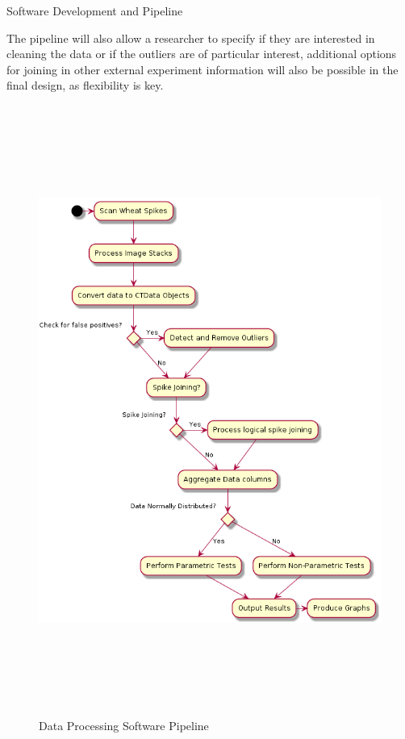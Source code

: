 \documentclass[final]{beamer}
\begin{document}
\begin{frame}{}
\begin{textblock}{28}
\begin{block}{Software Development and Pipeline}
\begin{multicols}{2}
      \vspace{0.5cm}

      The pipeline will also allow a researcher to specify if they are interested in cleaning the data
      or if the outliers are of particular interest, additional options for joining in other external
      experiment information will also be possible in the final design, as flexibility is key.

        \columnbreak

        \begin{figure}[htb]
          \centering
          \includegraphics[width=13.5cm, height=20cm]{flow.png}
          \caption{\label{fig:flow} Data Processing Software Pipeline }
        \end{figure}


\end{multicols}
\end{block}
\end{textblock}
\end{frame}
\end{document}
